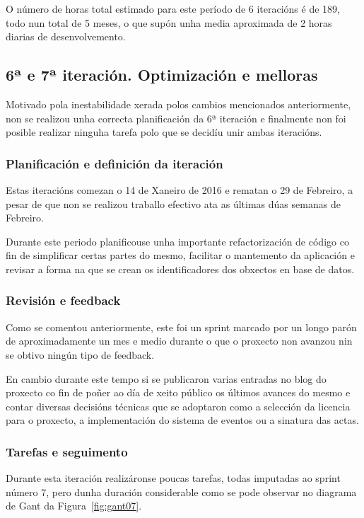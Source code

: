   O número de horas total estimado para este período de 6 iteracións é de 189, 
todo nun total de 5 meses, o que supón unha media aproximada de 2 horas 
diarias de desenvolvemento.

    \subsection{6ª e 7ª iteración. Optimización e melloras}
    Motivado pola inestabilidade xerada polos cambios mencionados anteriormente,
non se realizou unha correcta planificación da 6ª iteración e finalmente non 
foi posible realizar ninguha tarefa polo que se decidíu unir ambas iteracións.

      \subsubsection{Planificación e definición da iteración}
      Estas iteracións comezan o 14 de Xaneiro de 2016 e rematan o 29 de 
Febreiro, a pesar de que non se realizou traballo efectivo ata as últimas dúas 
semanas de Febreiro.

      Durante este periodo planificouse unha importante refactorización de 
código co fin de simplificar certas partes do mesmo, facilitar o mantemento 
da aplicación e revisar a forma na que se crean os identificadores dos 
obxectos en base de datos.

      \subsubsection{Revisión e feedback}
      Como se comentou anteriormente, este foi un sprint marcado por un longo 
parón de aproximadamente un mes e medio durante o que o proxecto non avanzou 
nin se obtivo ningún tipo de feedback.

      En cambio durante este tempo si se publicaron varias entradas no blog do 
proxecto co fin de poñer ao día de xeito público os últimos avances do mesmo
e contar diversas decisións técnicas que se adoptaron como a selección da 
licencia para o proxecto, a implementación do sistema de eventos ou a sinatura 
das actas.

      \subsubsection{Tarefas e seguimento}

      Durante esta iteración realizáronse poucas tarefas, todas imputadas ao 
sprint número 7, pero dunha duración considerable como se pode observar no 
diagrama de Gant da Figura~\ref{fig:gant07}.

